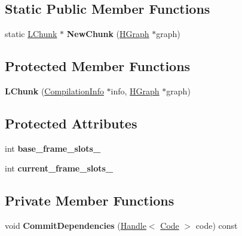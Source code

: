 \subsection*{Static Public Member Functions}
\begin{DoxyCompactItemize}
\item 
static \hyperlink{classv8_1_1internal_1_1_l_chunk}{L\+Chunk} $\ast$ {\bfseries New\+Chunk} (\hyperlink{classv8_1_1internal_1_1_h_graph}{H\+Graph} $\ast$graph)\hypertarget{classv8_1_1internal_1_1_l_chunk_a9a16a3f430aa2fd25bb966e5160ba642}{}\label{classv8_1_1internal_1_1_l_chunk_a9a16a3f430aa2fd25bb966e5160ba642}

\end{DoxyCompactItemize}
\subsection*{Protected Member Functions}
\begin{DoxyCompactItemize}
\item 
{\bfseries L\+Chunk} (\hyperlink{classv8_1_1internal_1_1_compilation_info}{Compilation\+Info} $\ast$info, \hyperlink{classv8_1_1internal_1_1_h_graph}{H\+Graph} $\ast$graph)\hypertarget{classv8_1_1internal_1_1_l_chunk_a17a1b6d45a4c45eaa15a1e8f154690df}{}\label{classv8_1_1internal_1_1_l_chunk_a17a1b6d45a4c45eaa15a1e8f154690df}

\end{DoxyCompactItemize}
\subsection*{Protected Attributes}
\begin{DoxyCompactItemize}
\item 
int {\bfseries base\+\_\+frame\+\_\+slots\+\_\+}\hypertarget{classv8_1_1internal_1_1_l_chunk_a058983694d6ef3b319414e9bce43b9b0}{}\label{classv8_1_1internal_1_1_l_chunk_a058983694d6ef3b319414e9bce43b9b0}

\item 
int {\bfseries current\+\_\+frame\+\_\+slots\+\_\+}\hypertarget{classv8_1_1internal_1_1_l_chunk_acd1e28ffbaa5de720dd9a500951933a2}{}\label{classv8_1_1internal_1_1_l_chunk_acd1e28ffbaa5de720dd9a500951933a2}

\end{DoxyCompactItemize}
\subsection*{Private Member Functions}
\begin{DoxyCompactItemize}
\item 
void {\bfseries Commit\+Dependencies} (\hyperlink{classv8_1_1internal_1_1_handle}{Handle}$<$ \hyperlink{classv8_1_1internal_1_1_code}{Code} $>$ code) const \hypertarget{classv8_1_1internal_1_1_l_chunk_a9b1531a50d36f7a28b813c3381eea03f}{}\label{classv8_1_1internal_1_1_l_chunk_a9b1531a50d36f7a28b813c3381eea03f}

\end{DoxyCompactItemize}
